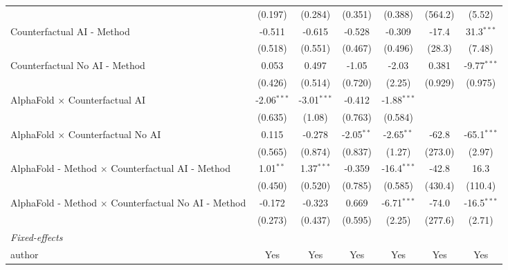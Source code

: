 \begin{tabular}{lcccccc}
                                                              & (0.197)       & (0.284)       & (0.351)      & (0.388)       & (564.2)    & (5.52)\\   
   Counterfactual AI - Method                                 & -0.511        & -0.615        & -0.528       & -0.309        & -17.4      & 31.3$^{***}$\\   
                                                              & (0.518)       & (0.551)       & (0.467)      & (0.496)       & (28.3)     & (7.48)\\   
   Counterfactual No AI - Method                              & 0.053         & 0.497         & -1.05        & -2.03         & 0.381      & -9.77$^{***}$\\   
                                                              & (0.426)       & (0.514)       & (0.720)      & (2.25)        & (0.929)    & (0.975)\\   
   AlphaFold $\times$ Counterfactual AI                       & -2.06$^{***}$ & -3.01$^{***}$ & -0.412       & -1.88$^{***}$ &            &   \\   
                                                              & (0.635)       & (1.08)        & (0.763)      & (0.584)       &            &   \\   
   AlphaFold $\times$ Counterfactual No AI                    & 0.115         & -0.278        & -2.05$^{**}$ & -2.65$^{**}$  & -62.8      & -65.1$^{***}$\\   
                                                              & (0.565)       & (0.874)       & (0.837)      & (1.27)        & (273.0)    & (2.97)\\   
   AlphaFold - Method $\times$ Counterfactual AI - Method     & 1.01$^{**}$   & 1.37$^{***}$  & -0.359       & -16.4$^{***}$ & -42.8      & 16.3\\   
                                                              & (0.450)       & (0.520)       & (0.785)      & (0.585)       & (430.4)    & (110.4)\\   
   AlphaFold - Method $\times$ Counterfactual No AI - Method  & -0.172        & -0.323        & 0.669        & -6.71$^{***}$ & -74.0      & -16.5$^{***}$\\   
                                                              & (0.273)       & (0.437)       & (0.595)      & (2.25)        & (277.6)    & (2.71)\\   
   \midrule
   \emph{Fixed-effects}\\
   author                                                     & Yes           & Yes           & Yes          & Yes           & Yes        & Yes\\  

\end{tabular}
